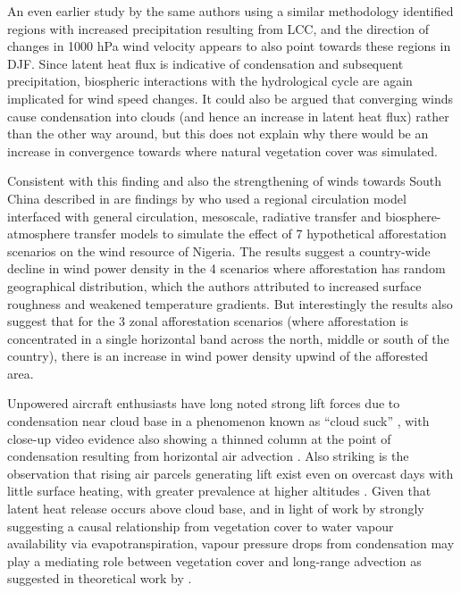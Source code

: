 An even earlier study by the same authors \citep{zhao2001} using a similar methodology identified regions with increased precipitation resulting from \ac{LCC}, and the direction of changes in 1000 hPa wind velocity appears to also point towards these regions in \ac{DJF}. Since latent heat flux is indicative of condensation and subsequent precipitation, biospheric interactions with the hydrological cycle are again implicated for wind speed changes. It could also be argued that converging winds cause condensation into clouds (and hence an increase in latent heat flux) rather than the other way around, but this does not explain why there would be an increase in convergence towards where natural vegetation cover was simulated.

Consistent with this finding and also the strengthening of winds towards South China described in \citep{li2020} are findings by \citet{matthew2017} who used a regional circulation model interfaced with general circulation, mesoscale, radiative transfer and biosphere-atmosphere transfer models to simulate the effect of 7 hypothetical afforestation scenarios on the wind resource of Nigeria. The results suggest a country-wide decline in wind power density in the 4 scenarios where afforestation has random geographical distribution, which the authors attributed to increased surface roughness and weakened temperature gradients. But interestingly the results also suggest that for the 3 zonal afforestation scenarios (where afforestation is concentrated in a single horizontal band across the north, middle or south of the country), there is an increase in wind power density upwind of the afforested area.

Unpowered aircraft enthusiasts have long noted strong lift forces due to condensation near cloud base in a phenomenon known as “cloud suck” \citep{gadd_thermals, pagen1992, pagen2001}, with close-up video evidence also showing a thinned column at the point of condensation resulting from horizontal air advection \citep{benz2021_read}. Also striking is the observation that rising air parcels generating lift exist even on overcast days with little surface heating, with greater prevalence at higher altitudes \citep{rejmanek2018, benz2021_full}. Given that latent heat release occurs above cloud base, and in light of work by \citet{gordon2003, jiang2013, yan2013, zhang2016} strongly suggesting a causal relationship from vegetation cover to water vapour availability via evapotranspiration, vapour pressure drops from condensation may play a mediating role between vegetation cover and long-range advection as suggested in theoretical work by \citet{makarieva2013}.

